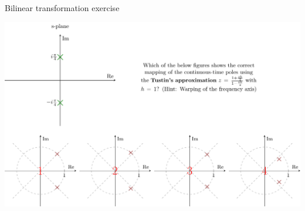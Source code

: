 \documentclass[presentation,aspectratio=1610]{beamer}
\begin{document}
\begin{frame}[label={sec:org47c0825}]{Bilinear transformation exercise}
\begin{center}
\includegraphics[width=\linewidth]{../../figures/tustin-diff-exercise}
\end{center}
\end{frame}
\end{document}
